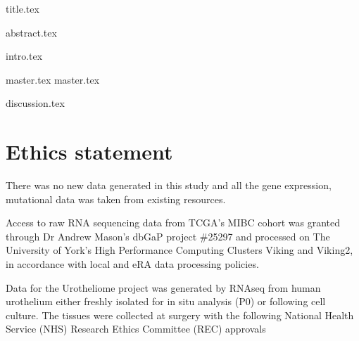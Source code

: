 \documentclass[a4paper, 12pt]{report}
\begin{document}
{title.tex}



\setcounter{tocdepth}{4}





{abstract.tex}


\tableofcontents
\newpage

\listoffigures
\newpage

\listoftables

\clearpage


\printglossary[nonumberlist]

\printglossary[type=\acronymtype,nonumberlist]
\newpage




{intro.tex}

{master.tex}
{master.tex}

{discussion.tex}


\chapter{Ethics statement}

There was no new data generated in this study and all the gene expression, mutational data was taken from existing resources.

Access to raw RNA sequencing data from TCGA's MIBC cohort was granted through Dr Andrew Mason's dbGaP project \#25297 and processed on The University of York's High Performance Computing Clusters Viking and Viking2, in accordance with local and eRA data processing policies.

Data for the Urotheliome project was generated by RNAseq from human urothelium either freshly isolated for in situ analysis (P0) or following cell culture. The tissues were collected at surgery with the following National Health Service (NHS) Research Ethics Committee (REC) approvals
\end{document}
